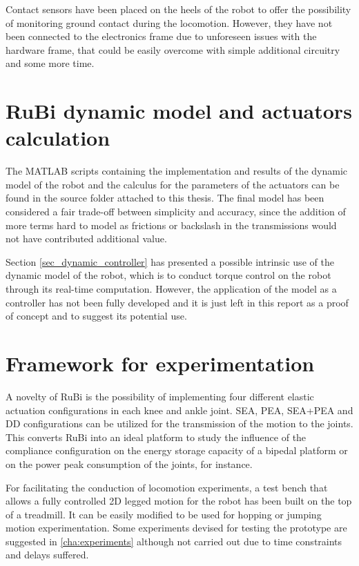 Contact sensors have been placed on the heels of the robot to offer the possibility of monitoring ground contact during the locomotion.
However, they have not been connected to the electronics frame due to unforeseen issues with the hardware frame, that could be easily overcome with simple additional circuitry and some more time.

\section{RuBi dynamic model and actuators calculation} %
\label{sec:rubi_dynamic_model_and_actuators_calculation}
The MATLAB scripts containing the implementation and results of the dynamic model of the robot and the calculus for the parameters of the actuators can be found in the source folder attached to this thesis.
The final model has been considered a fair trade-off between simplicity and accuracy, since the addition of more terms hard to model as frictions or backslash in the transmissions would not have contributed additional value.

Section \ref{sec_dynamic_controller} has presented a possible intrinsic use of the dynamic model of the robot, which is to conduct torque control on the robot through its real-time computation. 
However, the application of the model as a controller has not been fully developed and it is just left in this report as a proof of concept and to suggest its potential use.


\section{Framework for experimentation} %
\label{sec:framework_for_experimentation}
A novelty of RuBi is the possibility of implementing four different elastic actuation configurations in each knee and ankle joint.
SEA, PEA, SEA+PEA and DD configurations can be utilized for the transmission of the motion to the joints.
This converts RuBi into an ideal platform to study the influence of the compliance configuration on the energy storage capacity of a bipedal platform or on the power peak consumption of the joints, for instance.

For facilitating the conduction of locomotion experiments, a test bench that allows a fully controlled 2D legged motion for the robot has been built on the top of a treadmill.
It can be easily modified to be used for hopping or jumping motion experimentation.
Some experiments devised for testing the prototype are suggested in \ref{cha:experiments} although not carried out due to time constraints and delays suffered.

